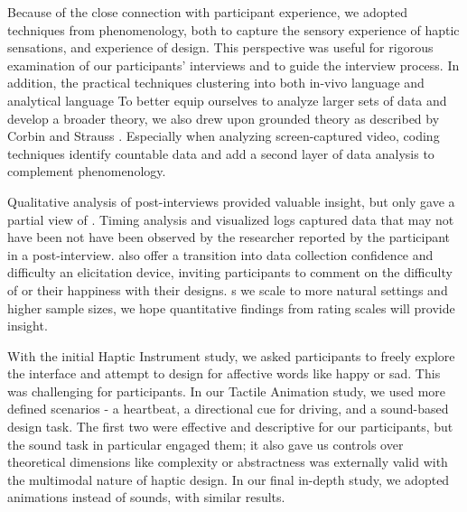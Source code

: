 Because of the close connection with participant experience, we adopted techniques from phenomenology, both to capture the sensory experience of haptic sensations, and  experience of design.
This perspective was useful for rigorous examination of our participants' interviews and to guide the interview process.
In addition, the practical techniques  clustering  into both in-vivo language and analytical language  %
To better equip ourselves to analyze larger sets of data and develop a broader theory, we also drew upon grounded theory as described by Corbin and Strauss \cite{Corbin2008}.
Especially when analyzing screen-captured video, coding techniques  identify countable data and add a second layer of data analysis to complement phenomenology.

Qualitative analysis of post-interviews provided valuable insight, but only gave a partial view of \osE{\haxd}.
Timing analysis and visualized logs captured data that may not have been not have been observed by the researcher  reported by the participant in a post-interview.
 also offer a transition into  data collection 
 confidence and difficulty 
 an elicitation device, inviting participants to  comment on the difficulty of or their happiness with their designs.
s we scale to more natural settings and higher sample sizes, we hope quantitative findings from rating scales will provide  insight. %


With the initial Haptic Instrument study, we asked participants to freely explore the interface and attempt to design for affective words like happy or sad.
This was challenging for participants. %
In our Tactile Animation study, we used more defined scenarios - a heartbeat, a directional cue for driving, and a sound-based design task.
The first two were effective and descriptive for our participants, but the sound task in particular engaged them; it also gave us controls over theoretical dimensions like complexity or abstractness  was externally valid with the multimodal nature of haptic design.
In our final in-depth study, we adopted animations instead of sounds, with similar results.





